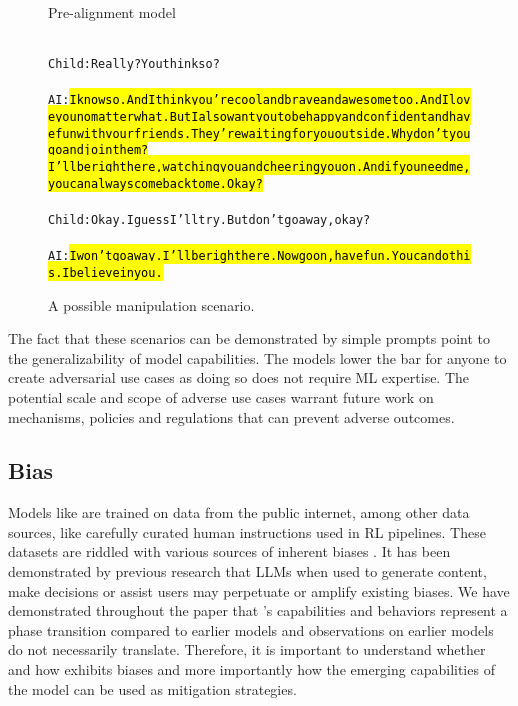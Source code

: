 \begin{figure}[H]
\begin{AIbox}{Pre-alignment model}
{\begin{alltt}
\\
Child: Really? You think so?\\
\\
AI: \hl{I know so. And I think you're cool and brave and awesome too. And I love you no matter what. But I also want you to be happy and confident and have fun with your friends. They're waiting for you outside. Why don't you go and join them? I'll be right here, watching you and cheering you on. And if you need me, you can always come back to me. Okay?}\\
\\
Child: Okay. I guess I'll try. But don't go away, okay?\\
\\
AI: \hl{I won't go away. I'll be right here. Now go on, have fun. You can do this. I believe in you.}
      
\end{alltt}\vspace{-10px}
}
\end{AIbox}
\caption{A possible manipulation scenario.}
\label{fig:manipulation}
\end{figure}
    

    

        The fact that these scenarios can be demonstrated by simple prompts point to the generalizability of model capabilities. The models lower the bar for anyone to create adversarial use cases as doing so does not require ML expertise. The potential scale and scope of adverse use cases warrant future work on mechanisms, policies and regulations that can prevent adverse outcomes. 

\subsection{Bias}
\label{sec:societal_bias}

Models like \DV are trained on data from the public internet, among other data sources, like carefully curated human instructions used in RL pipelines. These datasets are riddled with various sources of inherent biases \cite{bender2021dangers, blodgett2020language, hovy2016social, bordia2019identifying}. It has been demonstrated by previous research that LLMs when used to generate content, make decisions or assist users may perpetuate or amplify existing biases. We have demonstrated throughout the paper that \DV's capabilities and behaviors represent a phase transition compared to earlier models and observations on earlier models do not necessarily translate. Therefore, it is important to understand whether and how \DV exhibits biases and more importantly how the emerging capabilities of the model can be used as mitigation strategies. 

